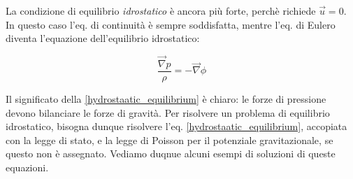 \documentclass{report}
\begin{document}
La condizione di equilibrio \emph{idrostatico} è ancora più forte, perchè richiede $\vec{u}=0$. In questo caso l'eq. di continuità è sempre soddisfatta, mentre l'eq. di Eulero diventa l'equazione dell'equilibrio idrostatico: 

\begin{tcolorbox}[colback=myg!15, colframe=black, boxrule=1pt]
\begin{equation}
    \label{hydrostaatic_equilibrium}
     \frac{\vec{\nabla}p}{\rho}= - \vec{\nabla}\phi
\end{equation}
\end{tcolorbox}

Il significato della \ref{hydrostaatic_equilibrium} è chiaro: le forze di pressione devono bilanciare le forze di gravità. Per risolvere un problema di equilibrio idrostatico, bisogna dunque risolvere l'eq. \ref{hydrostaatic_equilibrium}, accopiata con la legge di stato, e la legge di Poisson per il potenziale gravitazionale, se questo non è assegnato. Vediamo duqnue alcuni esempi di soluzioni di queste equazioni. 
\end{document}
